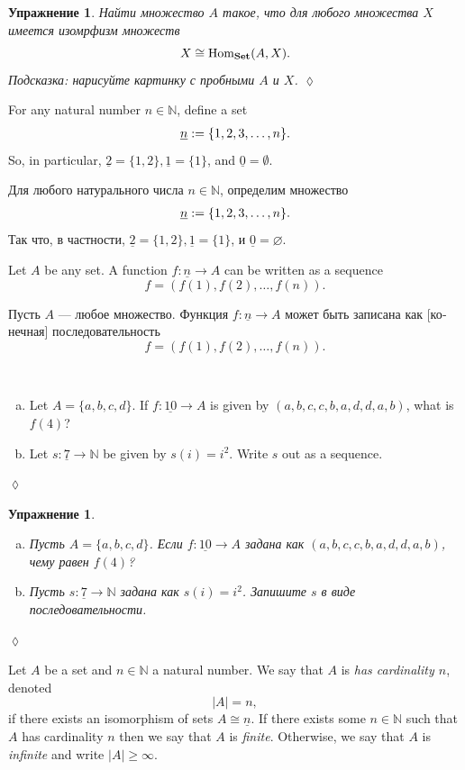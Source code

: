 \documentclass[a4paper]{book}
\def\tn{\textnormal}
\def\NN{{\mathbb N}}
\def\Hom{\tn{Hom}}
\def\to{\rightarrow}
\def\taking{\colon}
\def\iso{\cong}
\def\ul{\underline}
\def\Set{{\bf Set}}
\theoremstyle{myth}
\newtheorem{excENG}[envENG]{\begin{english}Exercise\end{english}}
\newtheorem{definitionENG}[envENG]{\begin{english}Definition\end{english}}
\newenvironment{exerciseENG}{\begin{excENG}}{\hspace*{\fill}$\lozenge$\end{excENG}}
\newtheorem{excRUS}[envRUS]{Упражнение}
\newenvironment{exerciseRUS}{\begin{excRUS}}{\hspace*{\fill}$\lozenge$\end{excRUS}}
\def\sexc{\begin{enumerate}[a.)]\setlength{\itemsep}{.1cm}\setlength{\parskip}{.1cm}\item}
\def\next{\item}
\def\endsexc{\end{enumerate}}
\begin{document}
\begin{russian}
\begin{exerciseRUS}\label{exc:generator for set}
Найти множество $A$ такое, что для любого множества $X$ имеется изомрфизм множеств $$X\iso\Hom_\Set(A,X).$$ Подсказка: нарисуйте картинку с пробными $A$ и $X$.
\end{exerciseRUS}

For any natural number $n\in\NN$, define a set 
\begin{align}\label{dia:underline n}\index{a symbol!$\ul{n}$}
\ul{n}:=\{1,2,3,\ldots,n\}.
\end{align}
So, in particular, $\ul{2}=\{1,2\}, \ul{1}=\{1\}$, and $\ul{0}=\emptyset$. 

Для любого натурального числа $n\in\NN$, определим множество 
\begin{align}\label{dia:underline n}\index{символ!$\ul{n}$}
\ul{n}:=\{1,2,3,\ldots,n\}.
\end{align}
Так что, в частности, $\ul{2}=\{1,2\}, \ul{1}=\{1\}$, и $\ul{0}=\varnothing$. 

Let $A$ be any set. A function $f\taking\ul{n}\to A$ can be written as a sequence $$f=(f(1),f(2),\ldots,f(n)).$$

Пусть $A$ — любое множество. Функция $f\taking\ul{n}\to A$ может быть записана как [конечная] последовательность $$f=(f(1),f(2),\ldots,f(n)).$$

\begin{exerciseENG}\label{exc:sequence}~
\sexc Let $A=\{a,b,c,d\}$. If $f\taking\ul{10}\to A$ is given by $(a,b,c,c,b,a,d,d,a,b)$, what is $f(4)$?
\next Let $s\taking\ul{7}\to\NN$ be given by $s(i)=i^2$. Write $s$ out as a sequence.
\endsexc
\end{exerciseENG}

\begin{exerciseRUS}\label{exc:sequence}~
 \sexc Пусть $A=\{a,b,c,d\}$. Если $f\taking\ul{10}\to A$ задана как $(a,b,c,c,b,a,d,d,a,b)$, чему равен $f(4)$?
\next Пусть $s\taking\ul{7}\to\NN$ задана как $s(i)=i^2$. Запишите $s$ в виде последовательности.
\endsexc
\end{exerciseRUS}

\begin{definitionENG}\label{def:cardinality}
Let $A$ be a set and $n\in\NN$ a natural number. We say that $A$ is {\em has cardinality $n$}, denoted $$|A|=n,$$ if there exists an isomorphism of sets $A\iso\ul{n}$. If there exists some $n\in\NN$ such that $A$ has cardinality $n$ then we say that $A$ is {\em finite}. Otherwise, we say that $A$ is {\em infinite} and write $|A|\geq\infty$.
\end{definitionENG}


\end{russian}
\end{document}

